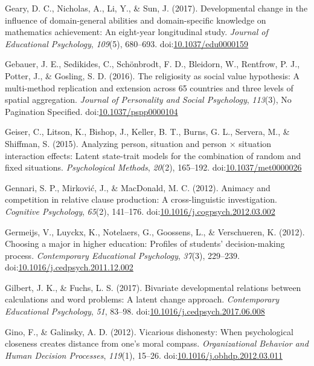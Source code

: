 \documentclass[english,man]{apa6}
\theoremstyle{definition}
\theoremstyle{definition}
\theoremstyle{definition}
\theoremstyle{remark}
\begin{document}
\hypertarget{ref-Geary2017}{}
Geary, D. C., Nicholas, A., Li, Y., \& Sun, J. (2017). Developmental
change in the influence of domain-general abilities and domain-specific
knowledge on mathematics achievement: An eight-year longitudinal study.
\emph{Journal of Educational Psychology}, \emph{109}(5), 680--693.
doi:\href{https://doi.org/10.1037/edu0000159}{10.1037/edu0000159}

\hypertarget{ref-Gebauer2016}{}
Gebauer, J. E., Sedikides, C., Schönbrodt, F. D., Bleidorn, W.,
Rentfrow, P. J., Potter, J., \& Gosling, S. D. (2016). The religiosity
as social value hypothesis: A multi-method replication and extension
across 65 countries and three levels of spatial aggregation.
\emph{Journal of Personality and Social Psychology}, \emph{113}(3), No
Pagination Specified.
doi:\href{https://doi.org/10.1037/pspp0000104}{10.1037/pspp0000104}

\hypertarget{ref-Geiser2015}{}
Geiser, C., Litson, K., Bishop, J., Keller, B. T., Burns, G. L.,
Servera, M., \& Shiffman, S. (2015). Analyzing person, situation and
person × situation interaction effects: Latent state-trait models for
the combination of random and fixed situations. \emph{Psychological
Methods}, \emph{20}(2), 165--192.
doi:\href{https://doi.org/10.1037/met0000026}{10.1037/met0000026}

\hypertarget{ref-Gennari2012}{}
Gennari, S. P., Mirković, J., \& MacDonald, M. C. (2012). Animacy and
competition in relative clause production: A cross-linguistic
investigation. \emph{Cognitive Psychology}, \emph{65}(2), 141--176.
doi:\href{https://doi.org/10.1016/j.cogpsych.2012.03.002}{10.1016/j.cogpsych.2012.03.002}

\hypertarget{ref-Germeijs2012}{}
Germeijs, V., Luyckx, K., Notelaers, G., Goossens, L., \& Verschueren,
K. (2012). Choosing a major in higher education: Profiles of students'
decision-making process. \emph{Contemporary Educational Psychology},
\emph{37}(3), 229--239.
doi:\href{https://doi.org/10.1016/j.cedpsych.2011.12.002}{10.1016/j.cedpsych.2011.12.002}

\hypertarget{ref-Gilbert2017}{}
Gilbert, J. K., \& Fuchs, L. S. (2017). Bivariate developmental
relations between calculations and word problems: A latent change
approach. \emph{Contemporary Educational Psychology}, \emph{51}, 83--98.
doi:\href{https://doi.org/10.1016/j.cedpsych.2017.06.008}{10.1016/j.cedpsych.2017.06.008}

\hypertarget{ref-Gino2012}{}
Gino, F., \& Galinsky, A. D. (2012). Vicarious dishonesty: When
psychological closeness creates distance from one's moral compass.
\emph{Organizational Behavior and Human Decision Processes},
\emph{119}(1), 15--26.
doi:\href{https://doi.org/10.1016/j.obhdp.2012.03.011}{10.1016/j.obhdp.2012.03.011}
\end{document}
